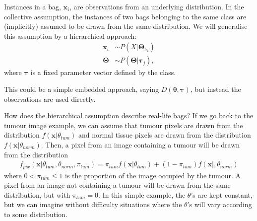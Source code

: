 Instances in a bag, $\mathbf{x}_i$, are observations from an underlying distribution. 
In the collective assumption, the instances of two bags belonging to the same class are (implicitly) assumed to be drawn from the same distribution.
We will generalise this assumption by a hierarchical approach: 
\begin{align}
  \mathbf{x}_i & \sim P(X|\mathbf{\Theta}_{b_k}) \\
  \mathbf{\Theta} & \sim P(\mathbf{\Theta}|\mathbf{\tau}_j), 
\end{align}
where $\mathbf{\tau}$ is a fixed parameter vector defined by the class. 

This could be a simple embedded approach, saying $D(\mathbf{\theta}, \mathbf{\tau})$, but instead the observations are used directly. 

How does the hierarchical assumption describe real-life bags?
If we go back to the tumour image example, we can assume that tumour pixels are drawn from the distribution $f(\mathbf{x}|\theta_{tum})$ and normal tissue pixels are drawn from the distribution $f(\mathbf{x}|\theta_{norm})$. Then, a pixel from an image containing a tumour will be drawn from the distribution 
\begin{align}
  f_{pix}(\mathbf{x}|\theta_{tum},\theta_{norm}, \pi_{tum}) = \pi_{tum}f(\mathbf{x}|\theta_{tum}) + (1-\pi_{tum})f(\mathbf{x}|, \theta_{norm})
\end{align}
where $0 < \pi_{tum} \leq 1$ is the proportion of the image occupied by the tumour.  
A pixel from an image not containing a tumour will be drawn from the same distribution, but with $\pi_{tum} = 0$.
In this simple example, the $\theta$'s are kept constant, but we can imagine without difficulty situations where the $\theta$'s will vary according to some distribution. 
